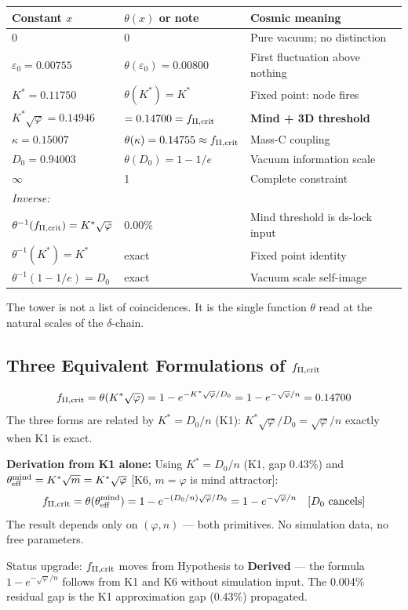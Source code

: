 \documentclass[12pt, a4paper]{article}
\begin{document}
\begin{center}
\renewcommand{\arraystretch}{1.3}
\begin{tabular}{p{3.5cm} p{3.8cm} p{4.5cm}}
\toprule
\textbf{Constant $x$} & \textbf{$\theta(x)$ or note} & \textbf{Cosmic meaning} \\
\midrule
0 & 0 & Pure vacuum; no distinction \\
$\varepsilon_0 = 0.00755$ & $\theta(\varepsilon_0) = 0.00800$ & First fluctuation above nothing \\
$K^* = 0.11750$ & $\theta(K^*) = K^*$ & Fixed point: node fires \\
$K^*\sqrt{\varphi} = 0.14946$ & $= 0.14700 = f_{\rm II,crit}$ & \textbf{Mind + 3D threshold} \\
$\kappa = 0.15007$ & $\theta(\kappa) = 0.14755\approx f_{\rm II,crit}$ & Mass-C coupling \\
$D_0 = 0.94003$ & $\theta(D_0) = 1-1/e$ & Vacuum information scale \\
$\infty$ & 1 & Complete constraint \\
\midrule
\textit{Inverse:} & & \\
$\theta^{-1}(f_{\rm II,crit}) = K^*\sqrt{\varphi}$ & 0.00\% & Mind threshold is ds-lock input \\
$\theta^{-1}(K^*) = K^*$ & exact & Fixed point identity \\
$\theta^{-1}(1-1/e) = D_0$ & exact & Vacuum scale self-image \\
\bottomrule
\end{tabular}
\end{center}

The tower is not a list of coincidences. It is the single function $\theta$ read at the
natural scales of the $\delta$-chain.

\subsection{Three Equivalent Formulations of $f_{\rm II,crit}$}

\begin{derivedbox}[title={Three Equivalent Formulations --- Gap 0.0015\%}]
\[
  f_{\rm II,crit} = \theta(K^*\sqrt{\varphi}) = 1-e^{-K^*\sqrt{\varphi}/D_0}
  = 1-e^{-\sqrt{\varphi}/n} = 0.14700
\]
The three forms are related by $K^* = D_0/n$ (K1): $K^*\sqrt{\varphi}/D_0 = \sqrt{\varphi}/n$
exactly when K1 is exact.

\textbf{Derivation from K1 alone:} Using $K^* = D_0/n$ (K1, gap 0.43\%) and
$\theta_{\rm eff}^{\rm mind} = K^*\sqrt{m} = K^*\sqrt{\varphi}$ [K6, $m=\varphi$ is mind attractor]:
\[
  f_{\rm II,crit} = \theta(\theta_{\rm eff}^{\rm mind}) = 1 - e^{-(D_0/n)\sqrt{\varphi}/D_0}
  = 1 - e^{-\sqrt{\varphi}/n} \quad [D_0\text{ cancels}]
\]
The result depends only on $(\varphi, n)$ --- both primitives. No simulation data, no free parameters.

Status upgrade: $f_{\rm II,crit}$ moves from Hypothesis to \textbf{Derived} --- the formula
$1-e^{-\sqrt{\varphi}/n}$ follows from K1 and K6 without simulation input.
The 0.004\% residual gap is the K1 approximation gap (0.43\%) propagated.
\end{derivedbox}
\end{document}
